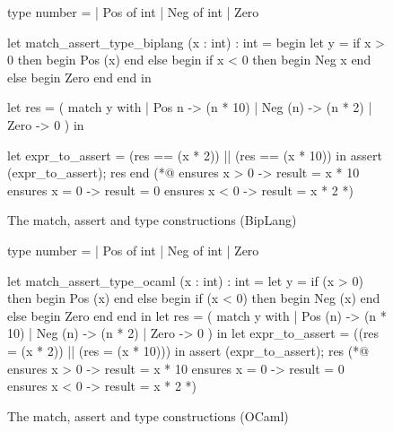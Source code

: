 \begin{figure}
\begin{minipage}{\linewidth}
\begin{biplangenv}
  type number = 
    | Pos of int
    | Neg of int
    | Zero

  let match_assert_type_biplang (x : int) : int = begin
    let y = 
      if x > 0 then begin Pos (x) end
      else begin
        if x < 0 then begin Neg x end
        else begin Zero end
      end
    in  

    let res = (
      match y with
      | Pos n -> (n * 10)
      | Neg (n) -> (n * 2)
      | Zero -> 0
    ) in
    
    let expr_to_assert = (res == (x * 2)) || (res == (x * 10)) in
    assert (expr_to_assert);
    res
  end
  (*@ ensures x > 0 -> result = x * 10
      ensures x = 0 -> result = 0
      ensures x < 0 -> result = x * 2 *)
\end{biplangenv}
\end{minipage}
\caption{The match, assert and type constructions (BipLang)}
\end{figure}

\begin{figure}
\begin{minipage}{\linewidth}
\begin{gospel}
  type number =
    | Pos of int
    | Neg of int
    | Zero

  let match_assert_type_ocaml (x : int) : int =
    let y = 
      if (x > 0)
      then begin 
        Pos (x)
      end else begin 
        if (x < 0)
        then begin 
          Neg (x)
        end else begin 
          Zero
        end
      end
    in
    let res = (
      match y with
      | Pos (n) -> (n * 10)
      | Neg (n) -> (n * 2)
      | Zero -> 0
    ) in
    let expr_to_assert = ((res = (x * 2)) || (res = (x * 10))) in
    assert (expr_to_assert);
    res
  (*@ ensures x > 0 -> result = x * 10
      ensures x = 0 -> result = 0
      ensures x < 0 -> result = x * 2 *)
\end{gospel}
\end{minipage}
\caption{The match, assert and type constructions (OCaml)}
\end{figure}

